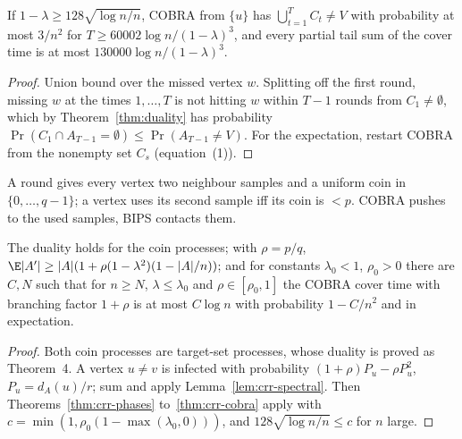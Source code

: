 \begin{theorem}[Theorem~1]\label{thm:crr-cobra}
\leanok{}
If $1-\lambda\ge128\sqrt{\log n/n}$, COBRA from $\{u\}$ has $\bigcup_{t=1}^T C_t\ne V$ with
probability at most $3/n^2$ for $T\ge60002\log n/(1-\lambda)^3$, and every partial tail sum of
the cover time is at most $130000\log n/(1-\lambda)^3$.
\end{theorem}
\begin{proof}\leanok
Union bound over the missed vertex $w$. Splitting off the first round, missing $w$ at the times
$1,\dots,T$ is not hitting $w$ within $T-1$ rounds from $C_1\ne\emptyset$, which by
Theorem~\ref{thm:duality} has probability $\Pr(C_1\cap A_{T-1}=\emptyset)\le\Pr(A_{T-1}\ne V)$.
For the expectation, restart COBRA from the nonempty set $C_s$ (equation~(1)).
\end{proof}

\begin{definition}\label{def:coin}
\leanok{}
A round gives every vertex two neighbour samples and a uniform coin in $\{0,\dots,q-1\}$; a vertex
uses its second sample iff its coin is $<p$. COBRA pushes to the used samples, BIPS contacts them.
\end{definition}

\begin{theorem}\label{thm:crr-coin}
\leanok{}
The duality holds for the coin processes; with $\rho=p/q$,
$\E|A'|\ge|A|(1+\rho(1-\lambda^2)(1-|A|/n))$; and for constants $\lambda_0<1$, $\rho_0>0$ there
are $C,N$ such that for $n\ge N$, $\lambda\le\lambda_0$ and $\rho\in[\rho_0,1]$ the COBRA cover time
with branching factor $1+\rho$ is at most $C\log n$ with probability $1-C/n^2$ and in expectation.
\end{theorem}
\begin{proof}\leanok
Both coin processes are target-set processes, whose duality is proved as Theorem~4. A vertex
$u\ne v$ is infected with probability $(1+\rho)P_u-\rho P_u^2$, $P_u=d_A(u)/r$; sum and apply
Lemma~\ref{lem:crr-spectral}. Then Theorems~\ref{thm:crr-phases} to~\ref{thm:crr-cobra} apply
with $c=\min(1,\rho_0(1-\max(\lambda_0,0)))$, and $128\sqrt{\log n/n}\le c$ for $n$ large.
\end{proof}



